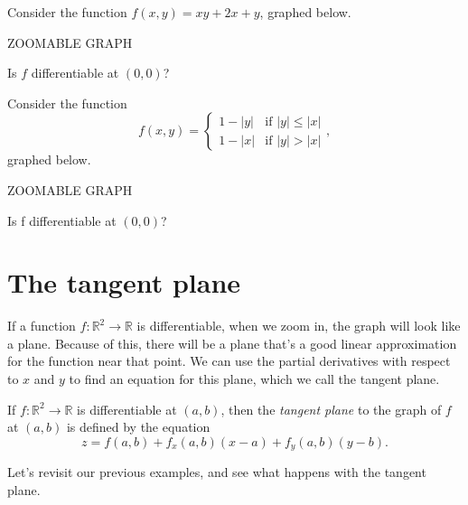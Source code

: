 \documentclass{ximera}
\begin{document}
\begin{example}
Consider the function $f(x,y) = xy+2x+y$, graphed below.

ZOOMABLE GRAPH

Is $f$ differentiable at $(0,0)$?
\begin{multipleChoice}
\end{multipleChoice}

\end{example}

\begin{example}
Consider the function 
\[
f(x,y) = \begin{cases} 
      1-|y| & \text{if }|y|\leq |x| \\
      1-|x| & \text{if }|y| > |x|
   \end{cases},
\] graphed below.

ZOOMABLE GRAPH

Is f differentiable at $(0,0)$?
\begin{multipleChoice}
\end{multipleChoice}

\end{example}

\section*{The tangent plane}

If a function $f:\mathbb{R}^2\rightarrow\mathbb{R}$ is differentiable, when we zoom in, the graph will look like a plane. Because of this, there will be a plane that's a good linear approximation for the function near that point. We can use the partial derivatives with respect to $x$ and $y$ to find an equation for this plane, which we call the tangent plane.

\begin{definition}
If $f:\mathbb{R}^2\rightarrow\mathbb{R}$ is differentiable at $(a,b)$, then the \emph{tangent plane} to the graph of $f$ at $(a,b)$ is defined by the equation
\[
z=f(a,b)+f_x(a,b)(x-a)+f_y(a,b)(y-b).
\]
\end{definition}

Let's revisit our previous examples, and see what happens with the tangent plane.
\end{document}
